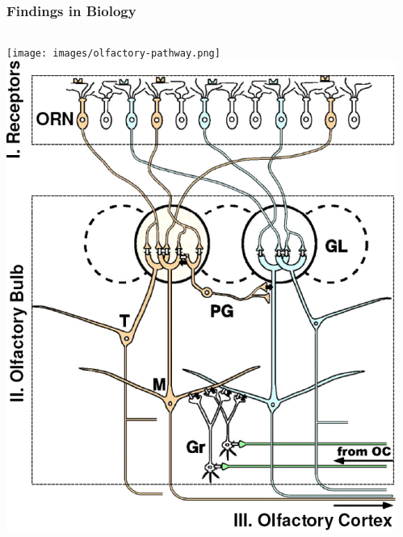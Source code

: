 \documentclass{beamer}
\begin{document}
\begin{frame}
\frametitle{Findings in Biology}
\begin{columns}
\texttt{[image: images/olfactory-pathway.png]} 
\includegraphics[width=1.0\linewidth]{images/olf-pathway-scheme.png}
\end{columns}
\end{frame}
\end{document}

